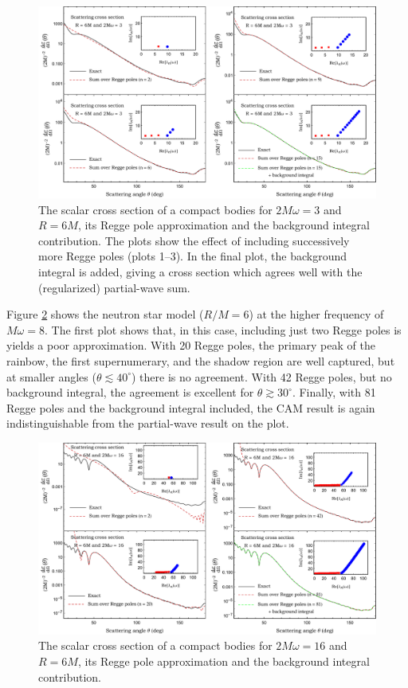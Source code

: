 \documentclass[aps,prd,longbibliography,reprint,twocolumn,amsmath,amssymb,amsfonts,showpacs,superscriptaddress]{revtex4-1}%
\begin{document}
\begin{figure}%
 \includegraphics[scale=0.50]{Scattering_Cross_Section_R_6_2Mw_3}
\caption{\label{S_0_R_6_2Mw_3_Exact_vs_CAM} The scalar cross section of a compact bodies for $2M\omega=3$ and $R=6M$, its Regge pole approximation and the background integral contribution. The plots show the effect of including successively more Regge poles (plots 1--3). In the final plot, the background integral is added, giving a cross section which agrees well with the (regularized) partial-wave sum.}
\end{figure}

Figure \ref{S_0_R_6_2Mw_16_Exact_vs_CAM} shows the neutron star model ($R/M = 6$) at the higher frequency of $M \omega = 8$. The first plot shows that, in this case, including just two Regge poles is yields a poor approximation. With 20 Regge poles, the primary peak of the rainbow, the first supernumerary, and the shadow region are well captured, but at smaller angles ($\theta  \lesssim 40^\circ$) there is no agreement. With 42 Regge poles, but no background integral, the agreement is excellent for $\theta \gtrsim 30^\circ$. Finally, with 81 Regge poles and the background integral included, the CAM result is again indistinguishable from the partial-wave result on the plot.

\begin{figure}%
 \includegraphics[scale=0.50]{Scattering_Cross_Section_R_6_2Mw_16}
\caption{\label{S_0_R_6_2Mw_16_Exact_vs_CAM} The scalar cross section of a compact bodies for $2M\omega=16$ and $R=6M$, its Regge pole approximation and the background integral contribution.}
\end{figure}
\end{document}
